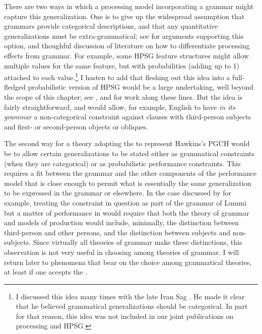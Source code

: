 \documentclass[a4paper]{article}
\begin{document}
There are two ways in which a processing model incorporating a grammar might capture this generalization.  One is to give up the widespread assumption that grammars provide categorical descriptions, and that any quantitative generalizations must be extra-grammatical; see \citet{FrancisPrep-b} for arguments supporting this option, and thoughful discussion of literature on how to differentiate processing effects from grammar.  For example, some HPSG feature structures might allow multiple values for the same feature, but with probabilities (adding up to 1) attached to each value.\footnote{I discussed this idea many times with the late Ivan Sag .  He made it clear that he believed grammatical generalizations should be categorical.  In part for that reason, this idea was not included in our joint publications on processing and HPSG.}  I hasten to add that fleshing out this idea into a full-fledged probabilistic version of HPSG would be a large undertaking, well beyond the scope of this chapter; see \citet{Linadarki2006}, and \citet{MT2008a-u} for work along these lines.  But the idea is fairly straightforward, and would allow, for example, English to have \emph{in its grammar} a non-categorical constraint against clauses with third-person subjects and first- or second-person objects or obliques.  

The second way for a theory adopting the  to represent Hawkins's PGCH would be to allow certain generalizations to be stated either as grammatical constraints (when they are categorical) or as probabilistic performance constraints.  This requires a fit between the grammar and the other components of the performance model that is close enough to permit what is essentially the same generalization to be expressed in the grammar or elsewhere.  In the case discussed by \citeauthor{BresnanEtAl2001} for example, treating the constraint in question as part of the grammar of Lummi but a matter of performance in  would require that both the theory of grammar and models of production would include, minimally, the distinction between third-person and other persons, and the distinction between subjects and non-subjects.  Since virtually all theories of grammar make these distinctions, this observation is not very useful in choosing among theories of grammar.  I will return later to phenomena that bear on the choice among grammatical theories, at least if one accepts the .
\end{document}

